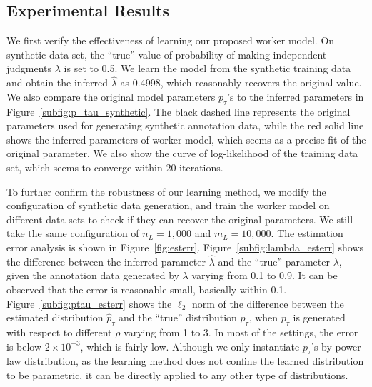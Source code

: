 \subsection{Experimental Results}


We first verify the effectiveness of learning our proposed worker model.  
On synthetic data set, the ``true'' value of probability of making independent judgments $\lambda$ is set to 0.5.  
We learn the model from the synthetic training data and obtain the inferred $\hat{\lambda}$ as 0.4998, 
which reasonably recovers the original value.  
We also compare the original model parameters $p_{\tau}$'s to the inferred parameters in Figure~\ref{subfig:p_tau_synthetic}.  
The black dashed line represents the original parameters used for generating synthetic annotation data, 
while the red solid line shows the inferred parameters of worker model, 
which seems as a precise fit of the original parameter.  
We also show the curve of log-likelihood of the training data set,
which seems to converge within 20 iterations.  

To further confirm the robustness of our learning method, 
we modify the configuration of synthetic data generation, 
and train the worker model on different data sets to check if they can recover the original parameters.  
We still take the same configuration of $n_L = 1,000$ and $m_L = 10,000$.  
The estimation error analysis is shown in Figure~\ref{fig:esterr}.  
Figure~\ref{subfig:lambda_esterr} shows the difference between the inferred parameter $\hat{\lambda}$ 
and the ``true'' parameter $\lambda$, 
given the annotation data generated by $\lambda$ varying from 0.1 to 0.9.  
It can be observed that the error is reasonable small, basically within 0.1.  
Figure~\ref{subfig:ptau_esterr} shows the $\ell_2$ norm of the difference between the estimated distribution $\hat{p}_{\tau}$
and the ``true'' distribution $p_{\tau}$, 
when $p_{\tau}$ is generated with respect to different $\rho$ varying from 1 to 3.  
In most of the settings, the error is below $2 \times 10^{-3}$, 
which is fairly low.  
Although we only instantiate $p_{\tau}$'s by power-law distribution, 
as the learning method does not confine the learned distribution to be parametric, 
it can be directly applied to any other type of distributions.  



